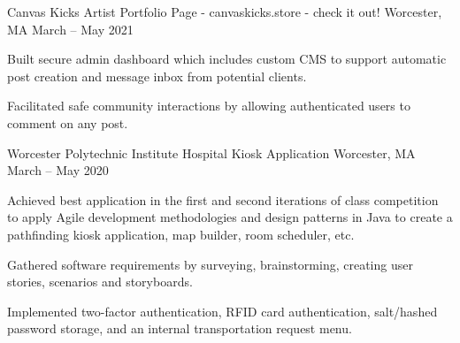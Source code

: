 

\begin{cventries}

\cventry
    {Canvas Kicks} %
    {Artist Portfolio Page - canvaskicks.store - check it out!} %
    {Worcester, MA} %
    {March – May 2021} %
    {
      \begin{cvitems} %
       \item {Built secure admin dashboard which includes custom CMS to support automatic post creation and message inbox from potential clients.}
       \item {Facilitated safe community interactions by allowing authenticated users to comment on any post.}
      \end{cvitems}
    }


  \cventry
    {Worcester Polytechnic Institute} %
    {Hospital Kiosk Application } %
    {Worcester, MA} %
    {March – May 2020} %
    {
      \begin{cvitems} %
       \item {Achieved best application in the first and second iterations of class competition to apply Agile development methodologies and
        design patterns in Java to create a pathfinding kiosk application, map builder, room scheduler, etc.}
        \item {Gathered software requirements by surveying, brainstorming, creating user stories, scenarios and storyboards.}
        \item {Implemented two-factor authentication, RFID card authentication, salt/hashed password storage, and an internal transportation request menu.}
      \end{cvitems}
    }



\end{cventries}
